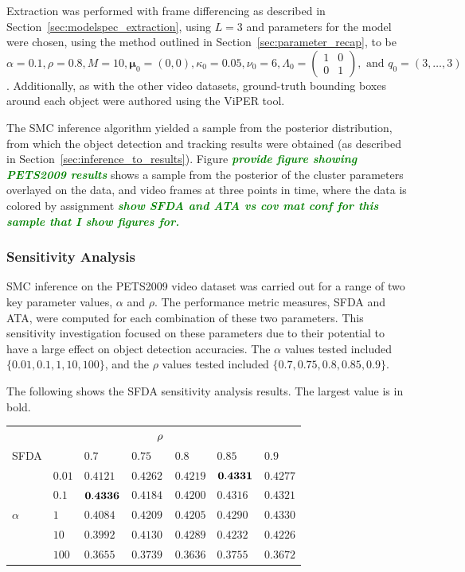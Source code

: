 \documentclass[smallcondensed, final]{svjour3}
\newcommand{\willie}[1]{\textcolor{green}{\textsf{\emph{\textbf{\textcolor{green}{#1}}}}}}
\begin{document}
Extraction was performed with frame differencing as described in Section~\ref{sec:modelspec_extraction}, using $L=3$ and parameters for the model were chosen, using the method outlined in Section~\ref{sec:parameter_recap}, to be $\alpha = 0.1, \rho = 0.8, M = 10, \boldsymbol{\mu}_{0} = (0,0), \kappa_{0} = 0.05, \nu_{0} = 6, \Lambda_{0} = \left( \begin{smallmatrix} 1&0\\ 0&1 \end{smallmatrix} \right), \text{ and } q_{0} = (3, \ldots, 3)$. Additionally, as with the other video datasets, ground-truth bounding boxes around each object were authored using the ViPER tool.

The SMC inference algorithm yielded a sample from the posterior distribution, from which the object detection and tracking results were obtained (as described in Section~\ref{sec:inference_to_results}). Figure \willie{provide figure showing PETS2009 results} shows a sample from the posterior of the cluster parameters overlayed on the data, and video frames at three points in time, where the data is colored by assignment
\willie{show SFDA and ATA vs cov mat conf for this sample that I show figures for.}




\subsubsection{Sensitivity Analysis}

SMC inference on the PETS2009 video dataset was carried out for a range of two key parameter values, $\alpha$ and $\rho$. The performance metric measures, SFDA and ATA, were computed for each combination of these two parameters. This sensitivity investigation focused on these parameters due to their potential to have a large effect on object detection accuracies. The $\alpha$ values tested included $\{ 0.01, 0.1, 1, 10, 100 \}$, and the $\rho$ values tested included $\{ 0.7, 0.75, 0.8, 0.85, 0.9 \}$.

The following shows the SFDA sensitivity analysis results. The largest value is in bold.
\begin{center}
\begin{tabular}[c]{l l  l  l  l  l  l}
  & & & $\hspace{8mm}\rho$ & & & \\
  SFDA  &  	& $0.7$ & $0.75$ & $0.8$ & $0.85$ & $0.9$  \\  
  &$0.01$ 	& $0.4121$ & $0.4262$ & $0.4219$ & $\bold{0.4331}$ & $0.4277$  \\
  &$0.1$  	& $\bold{0.4336}$ & $0.4184$ & $0.4200$ & $0.4316$ & $0.4321$  \\ 
$\alpha$ 	& $1$    & $0.4084$ & $0.4209$ & $0.4205$ & $0.4290$ & $0.4330$  \\  
  &$10$   	& $0.3992$ & $0.4130$ & $0.4289$ & $0.4232$ & $0.4226$  \\  
  &$100$  	& $0.3655$ & $0.3739$ & $0.3636$ & $0.3755$ & $0.3672$  \\
\end{tabular}
\end{center}
\end{document}
